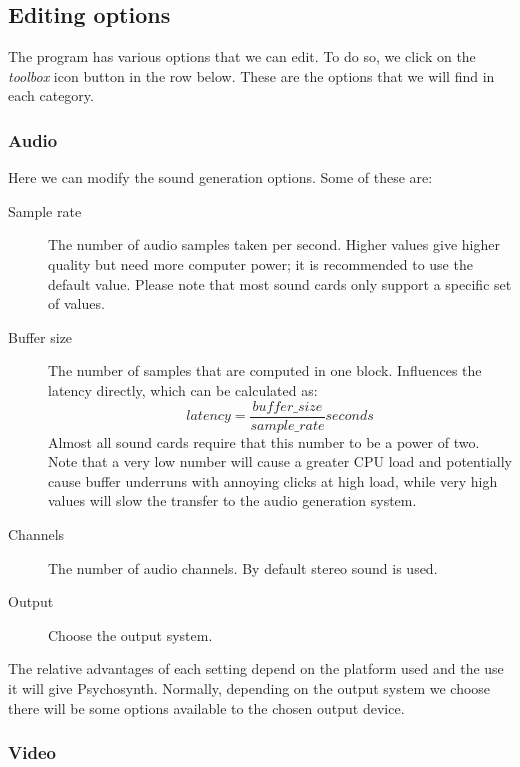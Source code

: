 \subsection{Editing options}

The program has various options that we can edit. To do so, we click
on the \emph{toolbox} icon button in the row below. These are the
options that we will find in each category.

\subsubsection{Audio}

Here we can modify the sound generation options. Some of these are:

\begin{description}
\item[Sample rate] The number of audio samples taken per
  second. Higher values give higher quality but need more computer
  power; it is recommended to use the default value. Please note that
  most sound cards only support a specific set of values.

\item[Buffer size] The number of samples that are computed in one
  block. Influences the latency directly, which can be calculated as:
  \begin{equation}
    latency = \frac{buffer\_size}{sample\_rate} seconds
  \end{equation}
  Almost all sound cards require that this number to be a power of
  two. Note that a very low number will cause a greater CPU load and
  potentially cause buffer underruns with annoying clicks at high
  load, while very high values will slow the transfer to the audio
  generation system.

\item[Channels] The number of audio channels. By default stereo sound
  is used.

\item[Output] Choose the output system.
\end{description}

The relative advantages of each setting depend on the platform used
and the use it will give Psychosynth. Normally, depending on the
output system we choose there will be some options available to the
chosen output device.

\subsubsection{Video}

